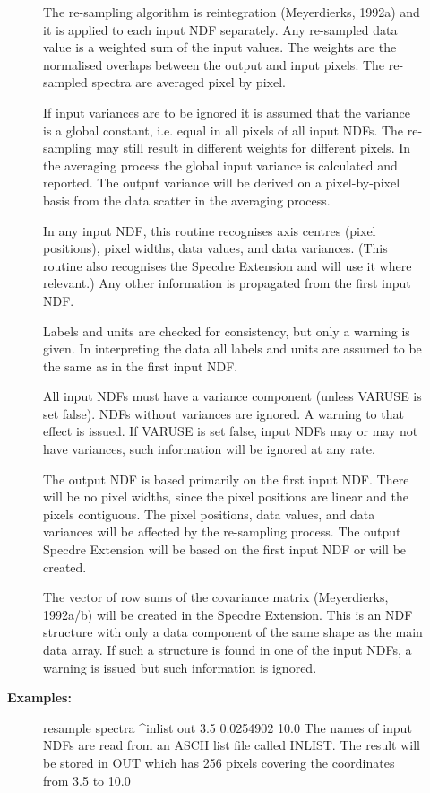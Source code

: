 \begin{description}
\begin{description}
\begin{terminalv}
   The re-sampling algorithm is reintegration (Meyerdierks, 1992a)
   and it is applied to each input NDF separately. Any re-sampled data
   value is a weighted sum of the input values. The weights are the
   normalised overlaps between the output and input pixels. The
   re-sampled spectra are averaged pixel by pixel.

   If input variances are to be ignored it is assumed that the
   variance is a global constant, i.e. equal in all pixels of all
   input NDFs. The re-sampling may still result in different weights
   for different pixels. In the averaging process the global input
   variance is calculated and reported. The output variance will be
   derived on a pixel-by-pixel basis from the data scatter in the
   averaging process.

   In any input NDF, this routine recognises axis centres (pixel
   positions), pixel widths, data values, and data variances. (This
   routine also recognises the Specdre Extension and will use it
   where relevant.) Any other information is propagated from the
   first input NDF.

   Labels and units are checked for consistency, but only a warning
   is given. In interpreting the data all labels and units are
   assumed to be the same as in the first input NDF.

   All input NDFs must have a variance component (unless VARUSE is
   set false). NDFs without variances are ignored. A warning to that
   effect is issued. If VARUSE is set false, input NDFs may or may
   not have variances, such information will be ignored at any rate.

   The output NDF is based primarily on the first input NDF. There
   will be no pixel widths, since the pixel positions are linear and
   the pixels contiguous. The pixel positions, data values, and
   data variances will be affected by the re-sampling process. The
   output Specdre Extension will be based on the first input NDF or
   will be created.

   The vector of row sums of the covariance matrix (Meyerdierks,
   1992a/b) will be created in the Specdre Extension. This is an NDF
   structure with only a data component of the same shape as the main
   data array. If such a structure is found in one of the input
   NDFs, a warning is issued but such information is ignored.
\end{terminalv}

\item [\textbf{Examples:}]
\begin{terminalv}
resample spectra ^inlist out 3.5 0.0254902 10.0
   The names of input NDFs are read from an ASCII list file called
   INLIST. The result will be stored in OUT which has 256
   pixels covering the coordinates from 3.5 to 10.0


\end{terminalv}
\end{description}
\end{description}
